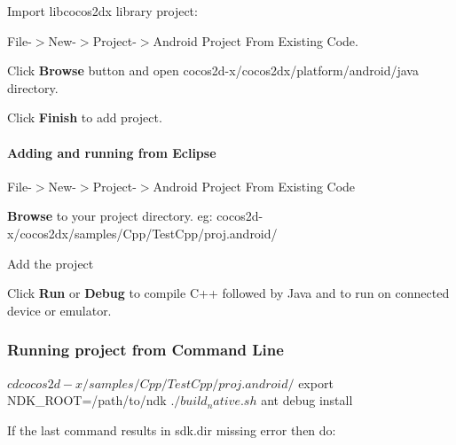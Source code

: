 \begin{DoxyEnumerate}
\begin{DoxyEnumerate}
\end{DoxyEnumerate}
\item Import libcocos2dx library project\-:
\begin{DoxyEnumerate}
\item File-\/$>$New-\/$>$Project-\/$>$Android Project From Existing Code.
\item Click {\bfseries Browse} button and open {\ttfamily cocos2d-\/x/cocos2dx/platform/android/java} directory.
\item Click {\bfseries Finish} to add project.
\end{DoxyEnumerate}
\end{DoxyEnumerate}

\paragraph*{Adding and running from Eclipse}

 


\begin{DoxyEnumerate}
\item File-\/$>$New-\/$>$Project-\/$>$Android Project From Existing Code
\item {\bfseries Browse} to your project directory. eg\-: {\ttfamily cocos2d-\/x/cocos2dx/samples/\-Cpp/\-Test\-Cpp/proj.\-android/}
\item Add the project
\item Click {\bfseries Run} or {\bfseries Debug} to compile C++ followed by Java and to run on connected device or emulator.
\end{DoxyEnumerate}

\subsubsection*{Running project from Command Line}

\begin{DoxyVerb}$ cd cocos2d-x/samples/Cpp/TestCpp/proj.android/
$ export NDK_ROOT=/path/to/ndk
$ ./build_native.sh
$ ant debug install
\end{DoxyVerb}


If the last command results in sdk.\-dir missing error then do\-: 
 